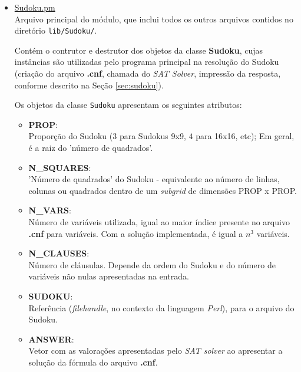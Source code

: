 \documentclass[a4paper]{article}
\begin{document}
    \begin{itemize}
      \item \href{run:../lib/Sudoku/Sudoku.pm}{Sudoku.pm} \\
        Arquivo principal do módulo, que inclui todos os outros 
        arquivos contidos no diretório \texttt{lib/Sudoku/}.
        
        Contém o contrutor e destrutor dos objetos da classe
        \textbf{Sudoku}, cujas instâncias são utilizadas pelo 
        programa principal na resolução do Sudoku (criação do 
        arquivo \textbf{.cnf}, chamada do \emph{SAT Solver}, 
        impressão da resposta, conforme descrito na Seção 
        \ref{sec:sudoku}).
        
        Os objetos da classe \texttt{Sudoku} apresentam os seguintes
        atributos:
        \begin{itemize}
          \item \textbf{PROP}: \\
            Proporção do Sudoku ($3$ para Sudokus 9x9, $4$ para 16x16, etc);
            Em geral, é a raiz do 'número de quadrados'.
          
          \item \textbf{N\_SQUARES}: \\
            'Número de quadrados' do Sudoku - equivalente ao número de 
            linhas, colunas ou quadrados dentro de um \emph{subgrid} de
            dimensões PROP x PROP.
            
          \item \textbf{N\_VARS}: \\
            Número de variáveis utilizada, igual ao maior índice presente
            no arquivo \textbf{.cnf} para variáveis. Com a solução 
            implementada, é igual a $n^3$ variáveis.
            
          \item \textbf{N\_CLAUSES}: \\
            Número de cláusulas. Depende da ordem do Sudoku e do número
            de variáveis não nulas apresentadas na entrada.
            
          \item \textbf{SUDOKU}: \\
            Referência (\emph{filehandle}, no contexto da linguagem 
            \emph{Perl}), para o arquivo do Sudoku.
            
          \item \textbf{ANSWER}: \\
            Vetor com as valorações apresentadas pelo \emph{SAT solver}
            ao apresentar a solução da fórmula do arquivo \textbf{.cnf}.
        \end{itemize}
        

\end{itemize}
\end{document}
